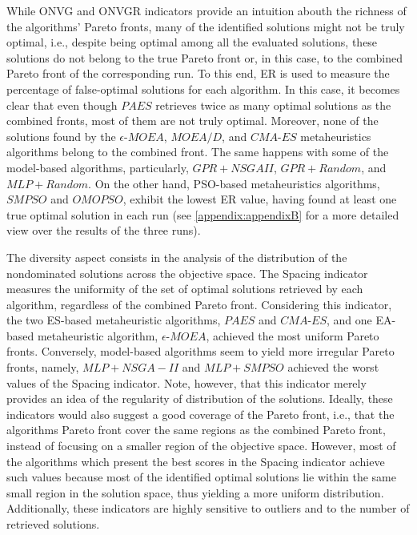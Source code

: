 While \ac{ONVG} and \ac{ONVGR} indicators provide an intuition abouth the richness of the algorithms' Pareto fronts, many of the identified solutions might not be truly optimal, i.e., despite being optimal among all the evaluated solutions, these solutions do not belong to the true Pareto front or, in this case, to the combined Pareto front of the corresponding run. To this end, \ac{ER} is used to measure the percentage of false-optimal solutions for each algorithm. In this case, it becomes clear that even though $PAES$ retrieves twice as many optimal solutions as the combined fronts, most of them are not truly optimal. Moreover, none of the solutions found by the $\epsilon$-$MOEA$, $MOEA/D$, and $CMA$-$ES$ metaheuristics algorithms belong to the combined front. The same happens with some of the model-based algorithms, particularly, $GPR+NSGAII$, $GPR+Random$, and $MLP+Random$. On the other hand, \ac{PSO}-based metaheuristics algorithms, $SMPSO$ and $OMOPSO$, exhibit the lowest \ac{ER} value, having found at least one true optimal solution in each run (see \cref{appendix:appendixB} for a more detailed view over the results of the three runs).

The diversity aspect consists in the analysis of the distribution of the nondominated solutions across the objective space. The Spacing indicator measures the uniformity of the set of optimal solutions retrieved by each algorithm, regardless of the combined Pareto front. Considering this indicator, the two \ac{ES}-based metaheuristic algorithms, $PAES$ and $CMA$-$ES$, and one \ac{EA}-based metaheuristic algorithm, $\epsilon$-$MOEA$, achieved the most uniform Pareto fronts. Conversely, model-based algorithms seem to yield more irregular Pareto fronts, namely, $MLP+NSGA-II$ and $MLP+SMPSO$ achieved the worst values of the Spacing indicator. Note, however, that this indicator merely provides an idea of the regularity of distribution of the solutions. Ideally, these indicators would also suggest a good coverage of the Pareto front, i.e., that the algorithms Pareto front cover the same regions as the combined Pareto front, instead of focusing on a smaller region of the objective space. However, most of the algorithms which present the best scores in the Spacing indicator achieve such values because most of the identified optimal solutions lie within the same small region in the solution space, thus yielding a more uniform distribution. Additionally, these indicators are highly sensitive to outliers and to the number of retrieved solutions. %

